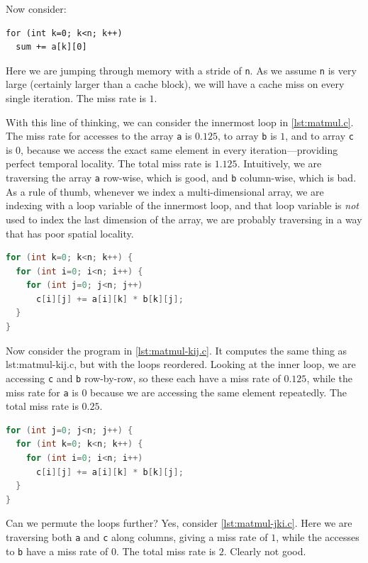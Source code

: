 Now consider:
\begin{lstlisting}
for (int k=0; k<n; k++)
  sum += a[k][0]
\end{lstlisting}
Here we are jumping through memory with a stride of \texttt{n}.  As we
assume \texttt{n} is very large (certainly larger than a cache block),
we will have a cache miss on every single iteration.  The miss rate is
$1$.

With this line of thinking, we can consider the innermost loop in
\cref{lst:matmul.c}.  The miss rate for accesses to the array
\texttt{a} is $0.125$, to array \texttt{b} is $1$, and to array
\texttt{c} is $0$, because we access the exact same element in every
iteration---providing perfect temporal locality.  The total miss rate
is $1.125$.  Intuitively, we are traversing the array \texttt{a}
row-wise, which is good, and \texttt{b} column-wise, which is bad.  As
a rule of thumb, whenever we index a multi-dimensional array, we are
indexing with a loop variable of the innermost loop, and that loop
variable is \emph{not} used to index the last dimension of the array,
we are probably traversing in a way that has poor spatial locality.

\begin{lstlisting}[caption=Matrix multiplication in C with the loops permuted.,
label={lst:matmul-kij.c},
language=C,
frame=single]
for (int k=0; k<n; k++) {
  for (int i=0; i<n; i++) {
    for (int j=0; j<n; j++)
      c[i][j] += a[i][k] * b[k][j];
  }
}
\end{lstlisting}

Now consider the program in \cref{lst:matmul-kij.c}.  It computes the
same thing as {lst:matmul-kij.c}, but with the loops reordered.
Looking at the inner loop, we are accessing \texttt{c} and \texttt{b}
row-by-row, so these each have a miss rate of $0.125$, while the miss
rate for \texttt{a} is $0$ because we are accessing the same element
repeatedly.  The total miss rate is $0.25$.

\begin{lstlisting}[caption=Matrix multiplication in C with the loops permuted.,
label={lst:matmul-jki.c},
language=C,
frame=single]
for (int j=0; j<n; j++) {
  for (int k=0; k<n; k++) {
    for (int i=0; i<n; i++)
      c[i][j] += a[i][k] * b[k][j];
  }
}
\end{lstlisting}

Can we permute the loops further?  Yes, consider
\cref{lst:matmul-jki.c}.  Here we are traversing both \texttt{a} and
\texttt{c} along columns, giving a miss rate of $1$, while the
accesses to \texttt{b} have a miss rate of $0$.  The total miss rate
is $2$.  Clearly not good.

